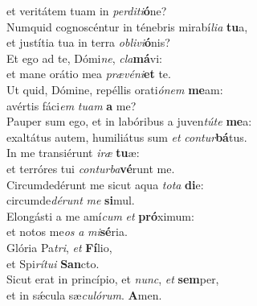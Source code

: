 \evenverse et veritátem tuam in \textit{per}\textit{di}\textit{ti}\textbf{ó}ne?\\
\oddverse Numquid cognoscéntur in ténebris mirabí\textit{li}\textit{a} \textbf{tu}a,~\*\\
\oddverse et justítia tua in terra \textit{o}\textit{bli}\textit{vi}\textbf{ó}nis?\\
\evenverse Et ego ad te, Dómi\textit{ne}, \textit{cla}\textbf{má}vi:~\*\\
\evenverse et mane orátio mea \textit{præ}\textit{vé}\textit{ni}\textbf{et} te.\\
\oddverse Ut quid, Dómine, repéllis orati\textit{ó}\textit{nem} \textbf{me}am:~\*\\
\oddverse avértis fáci\textit{em} \textit{tu}\textit{am} \textbf{a} me?\\
\evenverse Pauper sum ego, et in labóribus a juven\textit{tú}\textit{te} \textbf{me}a:~\*\\
\evenverse exaltátus autem, humiliátus sum \textit{et} \textit{con}\textit{tur}\textbf{bá}tus.\\
\oddverse In me transiérunt \textit{i}\textit{ræ} \textbf{tu}æ:~\*\\
\oddverse et terróres tui \textit{con}\textit{tur}\textit{ba}\textbf{vé}runt me.\\
\evenverse Circumdedérunt me sicut aqua \textit{to}\textit{ta} \textbf{di}e:~\*\\
\evenverse circumde\textit{dé}\textit{runt} \textit{me} \textbf{si}mul.\\
\oddverse Elongásti a me amí\textit{cum} \textit{et} \textbf{pró}ximum:~\*\\
\oddverse et notos me\textit{os} \textit{a} \textit{mi}\textbf{sé}ria.\\
\evenverse Glória Pa\textit{tri}, \textit{et} \textbf{Fí}lio,~\*\\
\evenverse et Spi\textit{rí}\textit{tu}\textit{i} \textbf{San}cto.\\
\oddverse Sicut erat in princípio, et \textit{nunc}, \textit{et} \textbf{sem}per,~\*\\
\oddverse et in sǽcula sæ\textit{cu}\textit{ló}\textit{rum}. \textbf{A}men.\\
